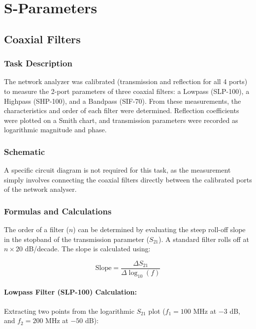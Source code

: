 \section{S-Parameters}
\subsection{Coaxial Filters}

\subsubsection{Task Description}
The network analyzer was calibrated (transmission and reflection for all 4 ports) to measure the 2-port parameters of three coaxial filters: a Lowpass (SLP-100), a Highpass (SHP-100), and a Bandpass (SIF-70). From these measurements, the characteristics and order of each filter were determined. Reflection coefficients were plotted on a Smith chart, and transmission parameters were recorded as logarithmic magnitude and phase.

\subsubsection{Schematic}

A specific circuit diagram is not required for this task, as the measurement simply involves connecting the coaxial filters directly between the calibrated ports of the network analyser.

\subsubsection{Formulas and Calculations}

The order of a filter ($n$) can be determined by evaluating the steep roll-off slope in the stopband of the transmission parameter ($S_{21}$). A standard filter rolls off at $n \times 20$ dB/decade. The slope is calculated using:

\begin{equation}
    \text{Slope} = \frac{\Delta S_{21}}{\Delta \log_{10}(f)}
\end{equation}

\paragraph{Lowpass Filter (SLP-100) Calculation:}
Extracting two points from the logarithmic $S_{21}$ plot ($f_1 = 100$ MHz at $-3$ dB, and $f_2 = 200$ MHz at $-50$ dB):


